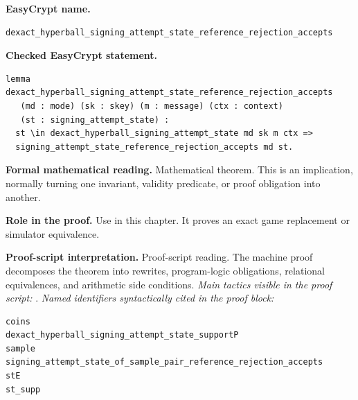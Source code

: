 \begin{formaltheorem}
\noindent\textbf{EasyCrypt name.}
\begin{lstlisting}[language=EasyCrypt,basicstyle=\ttfamily\scriptsize]
dexact_hyperball_signing_attempt_state_reference_rejection_accepts
\end{lstlisting}
\noindent\textbf{Checked EasyCrypt statement.}
\begin{lstlisting}[language=EasyCrypt,basicstyle=\ttfamily\scriptsize]
lemma dexact_hyperball_signing_attempt_state_reference_rejection_accepts
   (md : mode) (sk : skey) (m : message) (ctx : context)
   (st : signing_attempt_state) :
  st \in dexact_hyperball_signing_attempt_state md sk m ctx =>
  signing_attempt_state_reference_rejection_accepts md st.
\end{lstlisting}
\noindent\textbf{Formal mathematical reading.}
Mathematical theorem. This is an implication, normally turning one invariant, validity predicate, or proof obligation into another.

\noindent\textbf{Role in the proof.}
Use in this chapter. It proves an exact game replacement or simulator equivalence.

\noindent\textbf{Proof-script interpretation.}
Proof-script reading. The machine proof decomposes the theorem into rewrites, program-logic obligations, relational equivalences, and arithmetic side conditions.
\emph{Main tactics visible in the proof script:} .
\emph{Named identifiers syntactically cited in the proof block:}
\begin{lstlisting}[language=EasyCrypt,basicstyle=\ttfamily\scriptsize]
coins
dexact_hyperball_signing_attempt_state_supportP
sample
signing_attempt_state_of_sample_pair_reference_rejection_accepts
stE
st_supp
\end{lstlisting}

\end{formaltheorem}

